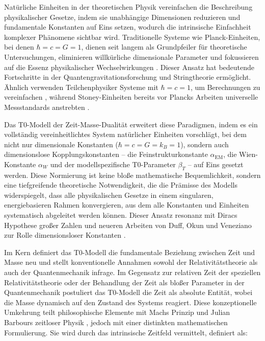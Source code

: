 \documentclass[twocolumn,aps,prl]{revtex4-2}
\begin{document}
	Natürliche Einheiten in der theoretischen Physik vereinfachen die Beschreibung physikalischer Gesetze, indem sie unabhängige Dimensionen reduzieren und fundamentale Konstanten auf Eins setzen, wodurch die intrinsische Einfachheit komplexer Phänomene sichtbar wird. Traditionelle Systeme wie Planck-Einheiten, bei denen \(\hbar = c = G = 1\), dienen seit langem als Grundpfeiler für theoretische Untersuchungen, eliminieren willkürliche dimensionale Parameter und fokussieren auf die Essenz physikalischer Wechselwirkungen \cite{Planck1899}. Dieser Ansatz hat bedeutende Fortschritte in der Quantengravitationsforschung \cite{Rovelli2004, Ashtekar2007} und Stringtheorie \cite{Greene1999} ermöglicht. Ähnlich verwenden Teilchenphysiker Systeme mit \(\hbar = c = 1\), um Berechnungen zu vereinfachen \cite{Peskin1995}, während Stoney-Einheiten bereits vor Plancks Arbeiten universelle Messstandards anstrebten \cite{Stoney1881}.
	
	Das T0-Modell der Zeit-Masse-Dualität erweitert diese Paradigmen, indem es ein vollständig vereinheitlichtes System natürlicher Einheiten vorschlägt, bei dem nicht nur dimensionale Konstanten (\(\hbar = c = G = k_B = 1\)), sondern auch dimensionslose Kopplungskonstanten – die Feinstrukturkonstante \(\alpha_{\text{EM}}\), die Wien-Konstante \(\alpha_W\) und der modellspezifische T0-Parameter \(\beta_T\) – auf Eins gesetzt werden. Diese Normierung ist keine bloße mathematische Bequemlichkeit, sondern eine tiefgreifende theoretische Notwendigkeit, die die Prämisse des Modells widerspiegelt, dass alle physikalischen Gesetze in einem singularen, energiebasieren Rahmen konvergieren, aus dem alle Konstanten und Einheiten systematisch abgeleitet werden können. Dieser Ansatz resonanz mit Diracs Hypothese großer Zahlen \cite{Dirac1937} und neueren Arbeiten von Duff, Okun und Veneziano zur Rolle dimensionsloser Konstanten \cite{Duff2002}.
	
	Im Kern definiert das T0-Modell die fundamentale Beziehung zwischen Zeit und Masse neu und stellt konventionelle Annahmen sowohl der Relativitätstheorie als auch der Quantenmechanik infrage. Im Gegensatz zur relativen Zeit der speziellen Relativitätstheorie \cite{Einstein1905} oder der Behandlung der Zeit als bloßer Parameter in der Quantenmechanik \cite{Schrodinger1926} postuliert das T0-Modell die Zeit als absolute Entität, wobei die Masse dynamisch auf den Zustand des Systems reagiert. Diese konzeptionelle Umkehrung teilt philosophische Elemente mit Machs Prinzip \cite{Mach1893} und Julian Barbours zeitloser Physik \cite{Barbour1999}, jedoch mit einer distinkten mathematischen Formulierung. Sie wird durch das intrinsische Zeitfeld vermittelt, definiert als:
	
\end{document}

